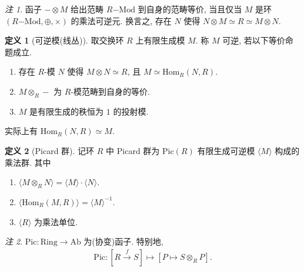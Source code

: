 \documentclass{MainStyle}
\theoremstyle{definition}
\theoremstyle{definition}
\theoremstyle{definition}
\newtheorem{definition}{定义}
\theoremstyle{definition}
\theoremstyle{definition}
\theoremstyle{definition}
\theoremstyle{definition}
\theoremstyle{remark}
\newtheorem{remark}{注}
\theoremstyle{remark}
\begin{document}
\begin{remark}
    函子 $-\otimes M$ 给出范畴 $R\mathrm{-Mod}$ 到自身的范畴等价, 当且仅当 $M$ 是环 $(R\mathrm{-Mod},\oplus,\times)$ 的乘法可逆元. 换言之, 存在 $N$ 使得 $N\otimes M\simeq R\simeq M\otimes N$.
\end{remark}

\begin{definition}[可逆模(线丛)]
    取交换环 $R$ 上有限生成模 $M$. 称 $M$ 可逆, 若以下等价命题成立.
    \begin{enumerate}
        \item 存在 $R$-模 $N$ 使得 $M\otimes N\simeq R$, 且 $M\simeq \mathrm{Hom}_R(N,R)$.
        \item $M\otimes_R-$ 为 $R$-模范畴到自身的等价.
        \item $M$ 是有限生成的秩恒为 $1$ 的投射模.
    \end{enumerate}
    实际上有 $\mathrm{Hom}_R(N,R)\simeq M$.
\end{definition}

\begin{definition}[Picard 群]
    记环 $R$ 中 Picard 群为 $\mathrm{Pic}(R)$ 有限生成可逆模 $\langle M\rangle$ 构成的乘法群. 其中
    \begin{enumerate}
        \item $\langle M\otimes_R N\rangle=\langle M\rangle\cdot \langle  N\rangle$.
        \item $\langle \mathrm{Hom}_R(M,R)\rangle=\langle M\rangle^{-1}$.
        \item $\langle R\rangle$ 为乘法单位.
    \end{enumerate}
\end{definition}

\begin{remark}
    $\mathrm{Pic}:\mathrm{Ring}\to \mathrm{Ab}$ 为(协变)函子. 特别地,
    \begin{align*}
        \mathrm{Pic}:\left[R\overset f\longrightarrow S\right]\mapsto [P\mapsto S\otimes_R P].
    \end{align*}
\end{remark}
\end{document}
